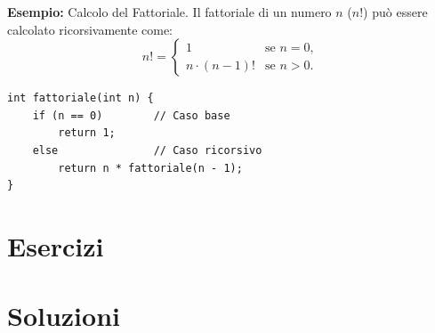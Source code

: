 \documentclass[oneside]{scrbook}
\begin{document}
\textbf{Esempio:} Calcolo del Fattoriale. Il fattoriale di un numero \( n \) (\( n! \)) può essere calcolato ricorsivamente come:
\[
n! = 
\begin{cases} 
1 & \text{se } n = 0, \\
n \cdot (n-1)! & \text{se } n > 0.
\end{cases}
\]
\begin{lstlisting}[style=cstyle]
int fattoriale(int n) {
    if (n == 0)        // Caso base
        return 1;
    else               // Caso ricorsivo
        return n * fattoriale(n - 1);
}
\end{lstlisting}



\section{Esercizi}




















\clearpage
\section*{Soluzioni}
\shipoutAnswer
\end{document}
